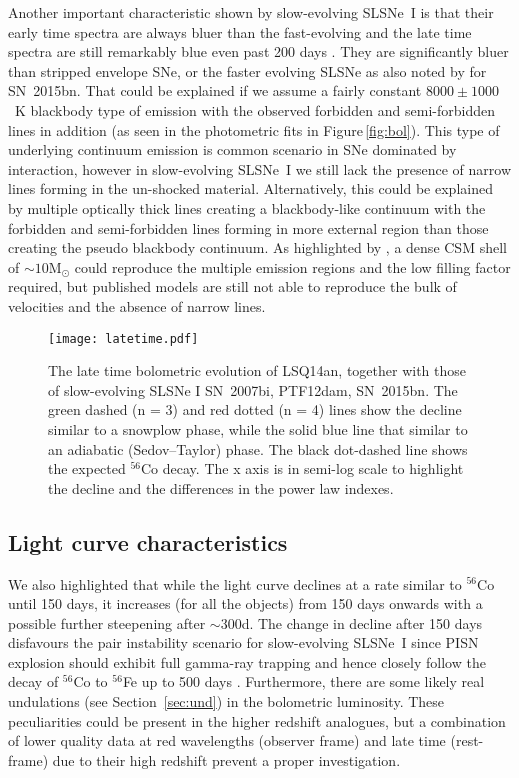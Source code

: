 \documentclass[useAMS,usenatbib]{mn2e}
\def\co{$^{56}$Co}
\def\fe{$^{56}$Fe}
\def\M{M$_{\odot}$}
\def\an{LSQ14an}
\begin{document}
Another important characteristic shown by slow-evolving SLSNe~I is that  their early time spectra are always bluer than the fast-evolving and the late time spectra are still remarkably blue even past 200 days
 \citep[see fig.~7 in][and Figure~\ref{fig:cmpel} here]{je16}. They are significantly  bluer than stripped envelope SNe, or 
the faster evolving SLSNe as also noted by \citet{ni15,ni16b} for SN~2015bn. That could be explained if we assume a
fairly constant $8000\pm1000$~K blackbody type of emission with the observed forbidden and semi-forbidden lines 
in addition (as seen in the photometric fits in Figure\,\ref{fig:bol}).  This type of underlying continuum emission is 
common scenario in  SNe dominated by interaction, however  in slow-evolving SLSNe~I we still lack the presence of narrow lines forming in the un-shocked material. Alternatively, this could be explained by multiple optically thick lines creating a blackbody-like continuum with the forbidden and semi-forbidden lines forming in more external region than those creating the pseudo blackbody continuum. As highlighted by \citet{je16}, a dense CSM shell of $\sim10$\M\/ could reproduce the multiple emission regions and the low filling factor required, but published models are still not able to reproduce the bulk of velocities and the absence of narrow lines.


\begin{figure} 
\texttt{[image: latetime.pdf]}
\caption{The late time bolometric evolution of \an\/, together with those of slow-evolving SLSNe I SN~2007bi, PTF12dam, SN~2015bn. The green dashed (n = 3) and red dotted (n = 4) lines show the decline similar to a snowplow phase, while the solid blue line that similar to an adiabatic (Sedov--Taylor) phase. The black dot-dashed line shows the expected \co\/ decay. The x axis is in semi-log scale to highlight the decline and the differences in the power law indexes.}
\label{fig:late}
\end{figure}

\subsection{Light curve characteristics}

We also highlighted that while the light curve declines 
at a rate similar to $^{56}${Co} until 150 days, it increases (for all the objects) from 150 days onwards with a possible further steepening after $\sim300$d. The change in decline after 150 days disfavours the pair instability scenario for slow-evolving SLSNe~I since PISN explosion should exhibit full gamma-ray trapping and hence closely follow the decay of \co\/ to \fe\/ up to 500 days \citep{je16a}. Furthermore, there are some likely real undulations (see Section~\ref{sec:und}) in the bolometric luminosity. 
These peculiarities could be present in the higher redshift analogues, but a combination of lower quality data 
at red wavelengths (observer frame) and late time  (rest-frame) due to their high redshift prevent a proper investigation.
\end{document}
